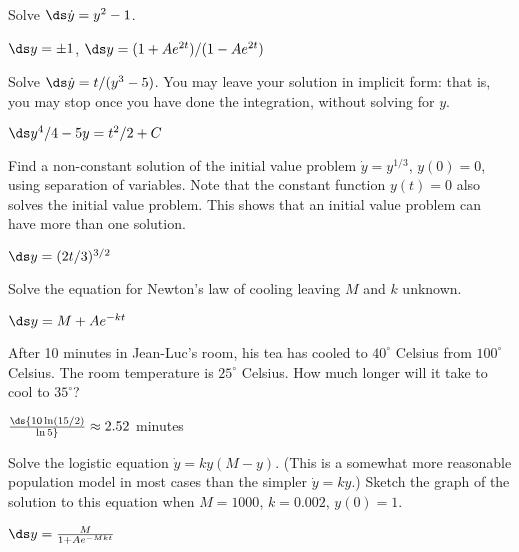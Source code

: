 \begin{exercises}
\begin{exercise}
\begin{exercise} Solve $\ds\dot{y} = y^2 -1$.
\begin{answer} $\ds y=\pm 1$, $\ds y=(1+Ae^{2t})/(1-Ae^{2t})$
\end{answer}\end{exercise}

\begin{exercise} Solve $\ds\dot{y} = t/(y^3 - 5)$. You may leave
your solution in implicit form: that is, you may stop once you have
done the integration, without solving for $y$.
\begin{answer} $\ds y^4/4-5y=t^2/2+C$
\end{answer}\end{exercise}

\begin{exercise} Find a non-constant solution of the initial value problem 
$\dot{y} = y^{1/3}$, $y(0)=0$, using
 separation of variables. Note that the constant function $y(t)=0 $
 also solves the initial value problem. This shows that an initial value
 problem can have more than one solution.
\begin{answer} $\ds y=(2t/3)^{3/2}$
\end{answer}\end{exercise}

\begin{exercise} Solve the equation for Newton's law of cooling leaving $M$
and $k$ unknown.
\begin{answer} $\ds y=M+Ae^{-kt}$
\end{answer}\end{exercise}

\begin{exercise} After 10 minutes in Jean-Luc's room, his tea has
cooled to $40^\circ $ Celsius from $100^\circ$ Celsius. 
The room temperature is $25^\circ$
Celsius. How much longer will it take to cool to $35^\circ$?
\begin{answer} $\ds {10\ln(15/2)\over\ln 5}\approx 2.52$ minutes
\end{answer}\end{exercise} 

\begin{exercise} Solve \label{exer:logistic equation}
the {\dfont logistic equation\/} $\dot{y} = ky(M-y)$. (This is a somewhat more
reasonable population model in most cases than the simpler
$\dot y=ky$.) Sketch the
graph of the solution to this equation when 
$M=1000$, $k=0.002$, $y(0)=1$.
\begin{answer} $\ds y={M\over 1+Ae^{-Mkt}}$
\end{answer}\end{exercise}


\end{exercise}
\end{exercises}
